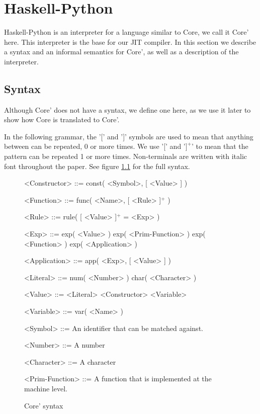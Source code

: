 
\chapter{Haskell-Python}
\label{chap:hs}

Haskell-Python\cite{haskellpython}
is an interpreter for a language similar to Core, we call it Core' here.
This interpreter is the base for our JIT compiler. In this section we describe a 
syntax and an informal semantics for Core', as well as a description of the 
interpreter.


\section{Syntax}
\label{sec:syntax}

Although Core' does not have a syntax, we define one here, as we use it later 
to show how Core is translated to Core'.

In the following grammar, the '[' and ']' symbols are used to mean that
anything between can be repeated, 0 or more times. We use '[' and '$]^+$' to 
mean that the pattern can be repeated 1 or more times. Non-terminals are 
written with italic font throughout the paper.
See figure \ref{gr:coresyn} for the full syntax.

\begin{figure}[H]
\centering
\scriptsize
\begin{grammar}
<Constructor> ::= const( <Symbol>, [ <Value> ] )

<Function> ::= func( <Name>, [ <Rule> ]$^+$ )

<Rule> ::= rule( [ <Value> ]$^+$ = <Exp> )

<Exp> ::= exp( <Value> )
     \alt exp( <Prim-Function> )
     \alt exp( <Function> )
     \alt exp( <Application> )

<Application> ::= app( <Exp>, [ <Value> ] )

<Literal> ::= num( <Number> )
	 \alt char( <Character> )

<Value> ::= <Literal>
       \alt <Constructor>
       \alt <Variable>

<Variable> ::= var( <Name> )

<Symbol> ::= An identifier that can be matched against.

<Number> ::= A number

<Character> ::= A character

<Prim-Function> ::= A function that is implemented at the machine level.

\end{grammar}

\caption{Core' syntax}
\label{gr:coresyn}

\end{figure}

